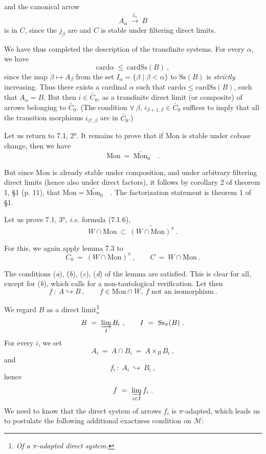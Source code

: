 \documentclass[11pt]{article}
\newcommand{\printedpage}[1]{\marginpar{\footnotesize p.~#1}}
\newcommand{\msp}[1]{\marginpar{\footnotesize [#1]}}
\newcommand{\Mon}{\mathrm{Mon}}
\newcommand{\Ss}{\mathrm{Ss}}
\newcommand{\card}{\mathrm{card}}
\begin{document}
\msp{page 93}

and the canonical arrow
\[
A_\alpha \ \xrightarrow{j_\alpha} \ B
\]
is in $C$, since the $j_\beta$ are and $C$ is stable under filtering direct limits.

We have thus completed the description of the transfinite systems. For every $\alpha$, we have
\[
\card \alpha \ \leq \ \card \Ss(B) \ ,
\]
since the map $\beta \longmapsto A_\beta$ from the set $I_\alpha = \{\beta \mid \beta < \alpha\}$ to $\Ss(B)$ is \textit{strictly} increasing. Thus there exists a cardinal $\alpha$ such that $\card \alpha \leq \card \Ss(B)$, such that $A_\alpha = B$. But then $i \in \widetilde{C_0}$, as a transfinite direct limit (or composite) of arrows belonging to $\widetilde{C_0}$. (The condition $\forall\ \beta$, $i_{\beta+1,\beta} \in \widetilde{C_0}$ suffices to imply that all the transition morphisms $i_{\beta',\beta}$ are in $\widetilde{C_0}$.)

Let us return to 7.1, 2°. It remains to prove that if Mon is stable under cobase change, then we have
\[
\Mon \ = \ \widetilde{\Mon_0} \quad .
\]

But since Mon is already stable under composition, and under arbitrary filtering direct limits (hence also under direct factors), it follows by corollary 2 of theorem 1, §1 (p. 11), that $\Mon = \widetilde{\Mon_0}$\ \ . The factorization statement is theorem 1 of §1.

\printedpage{52}

\msp{page 94}

Let us prove 7.1, 3°, \textit{i.e.} formula (7.1.6),
\[
W \cap \Mon \ \subset \ \widetilde{(W \cap \Mon)^{\pi}} \ .
\]

For this, we again apply lemma 7.3 to
\[
C_0 \ = \ (W \cap \Mon)^{\pi} \ , \qquad C \ = \ W \cap \Mon \ .
\]

The conditions (\textit{a}), (\textit{b}), (\textit{c}), (\textit{d}) of the lemma are satisfied. This is clear for all, except for (\textit{b}), which calls for a non-tautological verification. Let then
\[
f \ : \ A \hookrightarrow B \ , \qquad f \in \Mon \cap W,\ f \text{ not an isomorphism} \ .
\]

We regard $B$ as a direct limit\footnote[33]{\textit{Of a $\pi$-adapted direct system.}}
\[
B \ = \ \varinjlim_{I} B_i \ , \qquad I \ = \ \Ss_{\pi}(B) \ .
\]
For every $i$, we set
\[
A_i \ = \ A \cap B_i \ = \ A \times_B B_i \ ,
\]
and
\[
f_i \ : \ A_i \ \hookrightarrow \ B_i \ ,
\]
hence
\[
f \ = \ \varinjlim_{i \in I} f_i \ .
\]
We need to know that the direct system of arrows $f_i$ is $\pi$-adapted, which leads us to postulate the following additional exactness condition on $\mathcal{M}$:
\end{document}
